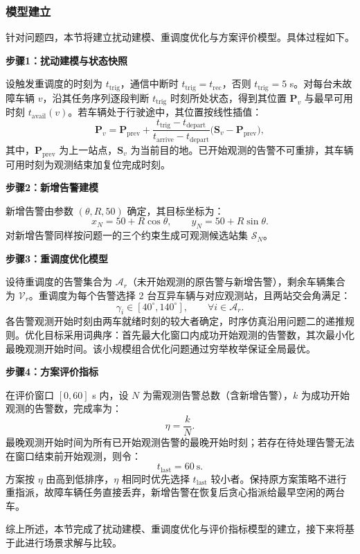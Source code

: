 
\subsubsection{模型建立}

针对问题四，本节将建立扰动建模、重调度优化与方案评价模型。具体过程如下。

\textbf{步骤1：扰动建模与状态快照}

设触发重调度的时刻为 $t_{\mathrm{trig}}$，通信中断时 $t_{\mathrm{trig}}=t_{\mathrm{rec}}$，否则 $t_{\mathrm{trig}}=5$ s。对每台未故障车辆 $v$，沿其任务序列逐段判断 $t_{\mathrm{trig}}$ 时刻所处状态，得到其位置 $\bm{P}_v$ 与最早可用时刻 $t_{\mathrm{avail}}(v)$。若车辆处于行驶途中，其位置按线性插值：
\begin{equation}
    \bm{P}_v=\bm{P}_{\mathrm{prev}}+\frac{t_{\mathrm{trig}}-t_{\mathrm{depart}}}{t_{\mathrm{arrive}}-t_{\mathrm{depart}}}\big(\bm{S}_v-\bm{P}_{\mathrm{prev}}\big),
\end{equation}
其中，$\bm{P}_{\mathrm{prev}}$ 为上一站点，$\bm{S}_v$ 为当前目的地。已开始观测的告警不可重排，其车辆可用时刻为观测结束加复位完成时刻。

\textbf{步骤2：新增告警建模}

新增告警由参数 $(\theta,R,50)$ 确定，其目标坐标为：
\begin{equation}
    x_N=50+R\cos\theta, \qquad y_N=50+R\sin\theta .
\end{equation}
对新增告警同样按问题一的三个约束生成可观测候选站集 $\mathcal{S}_N$。

\textbf{步骤3：重调度优化模型}

设待重调度的告警集合为 $\mathcal{A}_r$（未开始观测的原告警与新增告警），剩余车辆集合为 $\mathcal{V}_r$。重调度为每个告警选择 2 台互异车辆与对应观测站，且两站交会角满足：
\begin{equation}
    \gamma_i\in[40^\circ,140^\circ], \qquad \forall i\in\mathcal{A}_r .
\end{equation}
各告警观测开始时刻由两车就绪时刻的较大者确定，时序仿真沿用问题二的递推规则。优化目标采用词典序：首先最大化窗口内成功开始观测的告警数，其次最小化最晚观测开始时间。该小规模组合优化问题通过穷举枚举保证全局最优\cite{si2015suanfa}。

\textbf{步骤4：方案评价指标}

在评价窗口 $[0,60]$ s 内，设 $N$ 为需观测告警总数（含新增告警），$k$ 为成功开始观测的告警数，完成率为：
\begin{equation}
    \eta=\frac{k}{N} .
\end{equation}
最晚观测开始时间为所有已开始观测告警的最晚开始时刻；若存在待处理告警无法在窗口结束前开始观测，则令：
\begin{equation}
    t_{\mathrm{last}}=60\ \text{s}.
\end{equation}
方案按 $\eta$ 由高到低排序，$\eta$ 相同时优先选择 $t_{\mathrm{last}}$ 较小者。保持原方案策略不进行重指派，故障车辆任务直接丢弃，新增告警在恢复后贪心指派给最早空闲的两台车。

综上所述，本节完成了扰动建模、重调度优化与评价指标模型的建立，接下来将基于此进行场景求解与比较。
